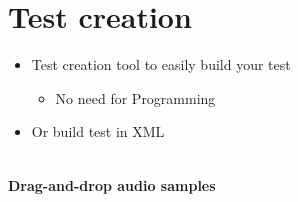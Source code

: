\vspace{-0.8cm}
\section{Test creation} %

\begin{itemize}
	\item Test creation tool to easily build your test
	\begin{itemize}
		\item No need for Programming
	\end{itemize}
	\item Or build test in XML
\end{itemize}

\begin{center}
\\ %
\small
\textbf{Drag-and-drop audio samples}
\end{center}